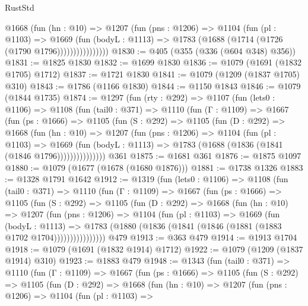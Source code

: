 \begin{lexlean}{RustStd}
\begin{coremodule}
{\begin{coremodule}
{{{{{{{{{{                  @1668
                    (fun (hn : @10) =>
                    @1207
                      (fun (pns : @1206) =>
                      @1104
                        (fun (pl : @1103) =>
                        @1669
                          (fun (bodyL : @1113) =>
                          @1783 (@1688 (@1714 (@1726 (@1790 @1796))))))))))))))))
@1830 := @405 (@355 (@336 (@604 @348) @356))
@1831 := @1825 @1830
@1832 := @1699 @1830
@1836 := @1079 (@1691 (@1832 @1705) @1712)
@1837 := @1721 @1830
@1841 := @1079 (@1209 (@1837 @1705) @310)
@1843 := @1786 (@1166 @1830)
@1844 := @1150 @1843
@1846 := @1079 (@1844 @1735)
@1874 := @1297
    (fun (rty : @292) =>
    @1107
      (fun (lets0 : @1106) =>
      @1108
        (fun (tail0 : @371) =>
        @1110
          (fun (Γ : @1109) =>
          @1667
            (fun (ps : @1666) =>
            @1105
              (fun (S : @292) =>
              @1105
                (fun (D : @292) =>
                @1668
                  (fun (hn : @10) =>
                  @1207
                    (fun (pns : @1206) =>
                    @1104
                      (fun (pl : @1103) =>
                      @1669
                        (fun (bodyL : @1113) =>
                        @1783 (@1688 (@1836 (@1841 (@1846 @1796)))))))))))))))
    @361
@1875 := @1681 @361
@1876 := @1875 @1097
@1880 := @1079 (@1677 (@1678 (@1680 @1876)))
@1881 := @1738 @1326
@1883 := @1328 @1791 @1642
@1912 := @1319
    (fun (lets0 : @1106) =>
    @1108
      (fun (tail0 : @371) =>
      @1110
        (fun (Γ : @1109) =>
        @1667
          (fun (ps : @1666) =>
          @1105
            (fun (S : @292) =>
            @1105
              (fun (D : @292) =>
              @1668
                (fun (hn : @10) =>
                @1207
                  (fun (pns : @1206) =>
                  @1104
                    (fun (pl : @1103) =>
                    @1669
                      (fun (bodyL : @1113) =>
                      @1783 (@1880 (@1836 (@1841 (@1846 (@1881 (@1883 @1702 @1704))))))))))))))))
    @479
@1913 := @363 @479
@1914 := @1913 @1704
@1918 := @1079 (@1691 (@1832 @1914) @1712)
@1922 := @1079 (@1209 (@1837 @1914) @310)
@1923 := @1883 @479
@1948 := @1343
    (fun (tail0 : @371) =>
    @1110
      (fun (Γ : @1109) =>
      @1667
        (fun (ps : @1666) =>
        @1105
          (fun (S : @292) =>
          @1105
            (fun (D : @292) =>
            @1668
              (fun (hn : @10) =>
              @1207
                (fun (pns : @1206) =>
                @1104
                  (fun (pl : @1103) =>
}}}}}}}}}}
\end{coremodule}}
\end{coremodule}
\end{lexlean}
